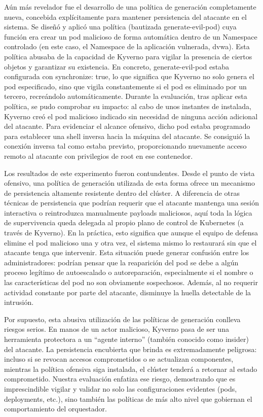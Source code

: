 \documentclass[12pt,twoside,titlepage]{report}
\begin{document}
Aún más revelador fue el desarrollo de una política de generación completamente nueva, concebida explícitamente para mantener persistencia del atacante en el sistema. Se diseñó y aplicó una política (bautizada generate-evil-pod) cuya función era crear un pod malicioso de forma automática dentro de un Namespace controlado (en este caso, el Namespace de la aplicación vulnerada, dvwa). Esta política abusaba de la capacidad de Kyverno para vigilar la presencia de ciertos objetos y garantizar su existencia. En concreto, generate-evil-pod estaba configurada con synchronize: true, lo que significa que Kyverno no solo genera el pod especificado, sino que vigila constantemente si el pod es eliminado por un tercero, recreándolo automáticamente. Durante la evaluación, tras aplicar esta política, se pudo comprobar su impacto: al cabo de unos instantes de instalada, Kyverno creó el pod malicioso indicado sin necesidad de ninguna acción adicional del atacante. Para evidenciar el alcance ofensivo, dicho pod estaba programado para establecer una shell inversa hacia la máquina del atacante. Se consiguió la conexión inversa tal como estaba previsto, proporcionando nuevamente acceso remoto al atacante con privilegios de root en ese contenedor. 

Los resultados de este experimento fueron contundentes. Desde el punto de vista ofensivo, una política de generación utilizada de esta forma ofrece un mecanismo de persistencia altamente resistente dentro del clúster. A diferencia de otras técnicas de persistencia que podrían requerir que el atacante mantenga una sesión interactiva o reintroduzca manualmente payloads maliciosos, aquí toda la lógica de supervivencia queda delegada al propio plano de control de Kubernetes (a través de Kyverno). En la práctica, esto significa que aunque el equipo de defensa elimine el pod malicioso una y otra vez, el sistema mismo lo restaurará sin que el atacante tenga que intervenir. Esta situación puede generar confusión entre los administradores: podrían pensar que la reaparición del pod se debe a algún proceso legítimo de autoescalado o autoreparación, especialmente si el nombre o las características del pod no son obviamente sospechosos. Además, al no requerir actividad constante por parte del atacante, disminuye la huella detectable de la intrusión.

Por supuesto, esta abusiva utilización de las políticas de generación conlleva riesgos serios. En manos de un actor malicioso, Kyverno pasa de ser una herramienta protectora a un “agente interno” (también conocido como insider) del atacante. La persistencia encubierta que brinda es extremadamente peligrosa: incluso si se revocan accesos comprometidos o se actualizan componentes, mientras la política ofensiva siga instalada, el clúster tenderá a retornar al estado comprometido. Nuestra evaluación enfatiza ese riesgo, demostrando que es imprescindible vigilar y validar no solo las configuraciones evidentes (pods, deployments, etc.), sino también las políticas de más alto nivel que gobiernan el comportamiento del orquestador.
\end{document}
